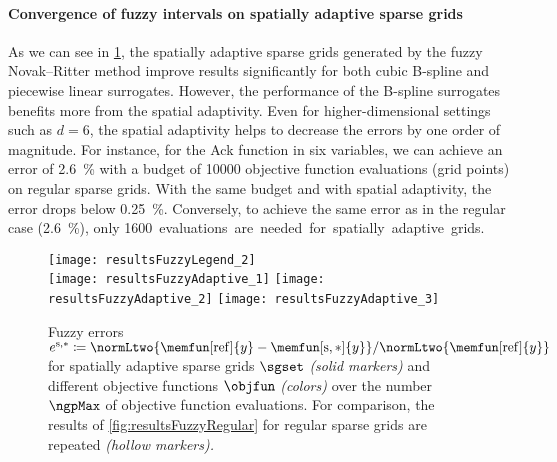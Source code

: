 \begin{algorithm}
  \caption[Fuzzy Novak--Ritter method]{%
    Fuzzy Novak--Ritter method to generate spatially adaptive sparse grids
    for the fuzzy extension principle.
    Inputs are
    the objective function $\objfun$,
    the adaptivity parameter $\gamma \in \clint{0, 1}$,
    the number of $\alpha$ segments,
    the initial sparse grid $\liset$ as a set of level-index pairs, and
    the $d$ fuzzy intervals $\fuzzy{x}_1, \dotsc, \fuzzy{x}_d$.
    The output is the spatially adaptive sparse grid $\liset$.%
  }%
  \label{alg:fuzzyNovakRitterMethod}%
\end{algorithm}

\paragraph{Convergence of fuzzy intervals on spatially adaptive sparse grids}

As we can see in \cref{fig:resultsFuzzyAdaptive},
the spatially adaptive sparse grids generated by the fuzzy Novak--Ritter
method improve results significantly
for both cubic B-spline and piecewise linear surrogates.
However, the performance of the B-spline surrogates benefits more
from the spatial adaptivity.
Even for higher-dimensional settings such as $d = 6$,
the spatial adaptivity helps to decrease the errors by one order of magnitude.
For instance, for the Ack function in six variables,
we can achieve an error of \SI{2.6}{\percent}
with a budget of \num{10000} objective function evaluations (grid points)
on regular sparse grids.
With the same budget and with spatial adaptivity, the error drops below
\SI{0.25}{\percent}.
Conversely, to achieve the same error as in the regular case
(\SI{2.6}{\percent}),
only \SI{1600} evaluations are needed for spatially adaptive grids.

\begin{figure}
  \texttt{[image: resultsFuzzyLegend\_2]}\\[2mm]%
  \texttt{[image: resultsFuzzyAdaptive\_1]}%
  \hfill%
  \texttt{[image: resultsFuzzyAdaptive\_2]}%
  \hfill%
  \texttt{[image: resultsFuzzyAdaptive\_3]}%
  \caption[Fuzzy errors for spatially adaptive sparse grids]{%
    Fuzzy errors
    $e^{\sparse,\ast}
    \ceq \normLtwo{\memfun[\reference]{y} - \memfun[\sparse,\ast]{y}}/
    \normLtwo{\memfun[\reference]{y}}$
    for spatially adaptive sparse grids $\sgset$ \emph{(solid markers)}
    and different objective functions $\objfun$ \emph{(colors)}
    over the number $\ngpMax$ of objective function evaluations.
    For comparison, the results of \cref{fig:resultsFuzzyRegular}
    for regular sparse grids are repeated \emph{(hollow markers).}%
  }%
  \label{fig:resultsFuzzyAdaptive}%
\end{figure}
